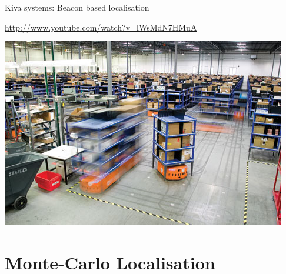 \documentclass[compress,xcolor=table]{beamer}
\begin{document}
\begin{frame}{Kiva systems: Beacon based localisation}
    \begin{center}
        \url{http://www.youtube.com/watch?v=lWsMdN7HMuA}

        \includegraphics[width=0.8\linewidth]{kiva}
    \end{center}
\end{frame}

\section{Monte-Carlo Localisation}
\end{document}
